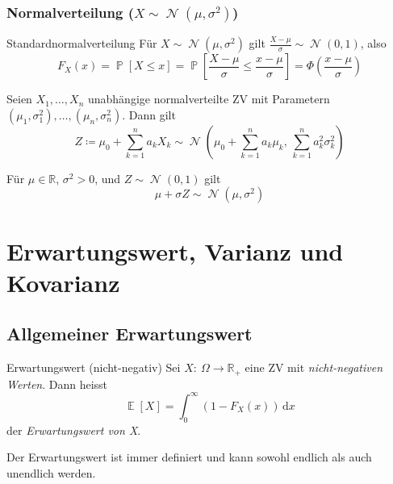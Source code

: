 \documentclass[a4paper,10pt]{article}
\def\R{\mathbb{R}}
\renewcommand{\P}{\operatorname{\mathbb{P}}}
\DeclareMathOperator{\E}{\mathbb{E}}
\DeclareMathOperator{\normal}{\mathcal{N}}
\numberwithin{equation}{section}
\begin{document}
\subsubsection{Normalverteilung (\( X \sim \normal(\mu, \sigma^2) \))}

\begin{subbox}{Standardnormalverteilung}
    Für \( X \sim \normal(\mu, \sigma^2) \) gilt \( \frac{X - \mu}{\sigma} \sim \normal(0, 1) \), also
    \[
        F_X(x) = \P[X \leq x] = \P\left[\frac{X - \mu}{\sigma} \leq \frac{x - \mu}{\sigma}\right] = \Phi\left(\frac{x - \mu}{\sigma}\right)
    \]
\end{subbox}

Seien \( X_1, \dots, X_n \) unabhängige normalverteilte ZV mit Parametern \( (\mu_1, \sigma_1^2), \dots, (\mu_n, \sigma_n^2) \). Dann gilt
\[
    Z \coloneqq \mu_0 + \sum_{k = 1}^n a_k X_k \sim \normal\left( \mu_0 + \sum_{k = 1}^n a_k \mu_k, \, \sum_{k = 1}^n  a_k^2 \sigma_k^2 \right)
\]

Für \( \mu \in \R \), \( \sigma^2 > 0 \), und \( Z \sim \normal(0, 1) \) gilt
\[
    \mu + \sigma Z \sim \normal(\mu, \sigma^2)
\]

\section{Erwartungswert, Varianz und Kovarianz}

\subsection{Allgemeiner Erwartungswert}

\begin{subbox}{Erwartungswert (nicht-negativ)}
    Sei \( X: \: \Omega \to \R_+ \) eine ZV mit \emph{nicht-negativen Werten}.
    Dann heisst
    \[
        \E[X] = \int_0^\infty (1 - F_X(x)) \, \mathrm{d}x
    \]
    der \emph{Erwartungswert von X}.
\end{subbox}
Der Erwartungswert ist immer definiert und kann sowohl endlich als auch unendlich werden.
\end{document}
